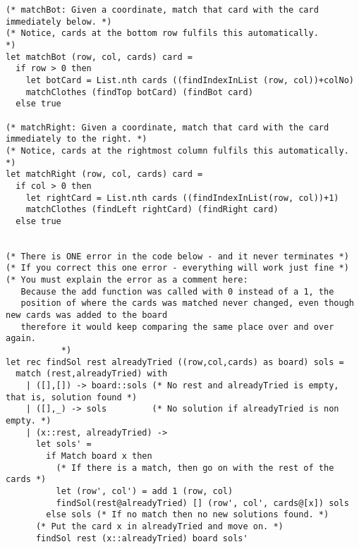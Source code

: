 \begin{lstlisting}
(* matchBot: Given a coordinate, match that card with the card immediately below. *)
(* Notice, cards at the bottom row fulfils this automatically.                    *)
let matchBot (row, col, cards) card =
  if row > 0 then
    let botCard = List.nth cards ((findIndexInList (row, col))+colNo)
    matchClothes (findTop botCard) (findBot card)
  else true
  
(* matchRight: Given a coordinate, match that card with the card immediately to the right. *)
(* Notice, cards at the rightmost column fulfils this automatically.                       *)
let matchRight (row, col, cards) card =
  if col > 0 then
    let rightCard = List.nth cards ((findIndexInList(row, col))+1)
    matchClothes (findLeft rightCard) (findRight card)
  else true
  
 
(* There is ONE error in the code below - and it never terminates *)
(* If you correct this one error - everything will work just fine *)
(* You must explain the error as a comment here:
   Because the add function was called with 0 instead of a 1, the
   position of where the cards was matched never changed, even though new cards was added to the board
   therefore it would keep comparing the same place over and over again.
           *)
let rec findSol rest alreadyTried ((row,col,cards) as board) sols =
  match (rest,alreadyTried) with
    | ([],[]) -> board::sols (* No rest and alreadyTried is empty, that is, solution found *)
    | ([],_) -> sols         (* No solution if alreadyTried is non empty. *)
    | (x::rest, alreadyTried) ->
      let sols' = 
        if Match board x then
          (* If there is a match, then go on with the rest of the cards *)
          let (row', col') = add 1 (row, col)
          findSol(rest@alreadyTried) [] (row', col', cards@[x]) sols
        else sols (* If no match then no new solutions found. *)
      (* Put the card x in alreadyTried and move on. *)
      findSol rest (x::alreadyTried) board sols'

\end{lstlisting}